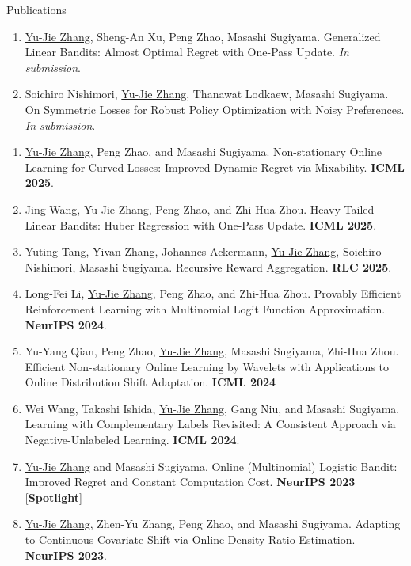 \documentclass{resume} %
\begin{document}
\begin{rSection}{Publications}
\begin{enumerate}[leftmargin=0.2in]
	\item \underline{Yu-Jie Zhang}, Sheng-An Xu, Peng Zhao, Masashi Sugiyama. Generalized Linear Bandits: Almost Optimal Regret with One-Pass Update. \emph{In submission}.
	\item Soichiro Nishimori, \underline{Yu-Jie Zhang}, Thanawat Lodkaew, Masashi Sugiyama. On Symmetric Losses for Robust Policy Optimization with Noisy Preferences. \emph{In submission}.
\end{enumerate}

\begin{enumerate}[leftmargin=0.2in]
	\item \underline{Yu-Jie Zhang}, Peng Zhao, and Masashi Sugiyama. Non-stationary Online Learning for Curved Losses: Improved Dynamic Regret via Mixability. \textbf{ICML 2025}. 
	
	\item Jing Wang, \underline{Yu-Jie Zhang}, Peng Zhao, and Zhi-Hua Zhou. Heavy-Tailed Linear Bandits: Huber Regression with One-Pass Update. \textbf{ICML 2025}.

	\item Yuting Tang, Yivan Zhang, Johannes Ackermann, \underline{Yu-Jie Zhang}, Soichiro Nishimori, Masashi Sugiyama. Recursive Reward Aggregation. \textbf{RLC 2025}.
	
	\item Long-Fei Li, \underline{Yu-Jie Zhang}, Peng Zhao, and Zhi-Hua Zhou. Provably Efficient Reinforcement Learning with Multinomial Logit Function Approximation. \textbf{NeurIPS 2024}.
	
	\item Yu-Yang Qian, Peng Zhao, \underline{Yu-Jie Zhang}, Masashi Sugiyama, Zhi-Hua Zhou. Efficient Non-stationary Online Learning by Wavelets with Applications to Online Distribution Shift Adaptation. \textbf{ICML 2024}
	
	\item Wei Wang, Takashi Ishida, \underline{Yu-Jie Zhang}, Gang Niu, and Masashi Sugiyama. Learning with Complementary Labels Revisited: A Consistent Approach via Negative-Unlabeled Learning. \textbf{ICML 2024}.
	 	 
	\item \underline{Yu-Jie Zhang} and Masashi Sugiyama. Online (Multinomial) Logistic Bandit: Improved Regret and Constant Computation Cost. \textbf{NeurIPS 2023} {\color{darkred}[\textbf{Spotlight}]}
	\item \underline{Yu-Jie Zhang}, Zhen-Yu Zhang, Peng Zhao, and Masashi Sugiyama. Adapting to Continuous Covariate Shift via Online Density Ratio Estimation. \textbf{NeurIPS 2023}.
	

\end{enumerate}
\end{rSection}
\end{document}
